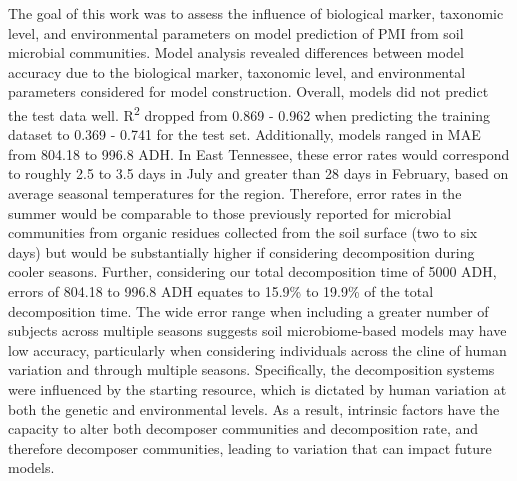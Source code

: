 \documentclass[
  10pt,
  letterpaper,
]{article}
\begin{document}
The goal of this work was to assess the influence of biological marker,
taxonomic level, and environmental parameters on model prediction of PMI
from soil microbial communities. Model analysis revealed differences
between model accuracy due to the biological marker, taxonomic level,
and environmental parameters considered for model construction. Overall,
models did not predict the test data well. R\textsuperscript{2} dropped
from 0.869 - 0.962 when predicting the training dataset to 0.369 - 0.741
for the test set. Additionally, models ranged in MAE from 804.18 to
996.8 ADH. In East Tennessee, these error rates would correspond to
roughly 2.5 to 3.5 days in July and greater than 28 days in February,
based on average seasonal temperatures for the region. Therefore, error
rates in the summer would be comparable to those previously reported for
microbial communities from organic residues collected from the soil
surface (two to six days) \citep{belk_microbiome_2018} but would be
substantially higher if considering decomposition during cooler seasons.
Further, considering our total decomposition time of 5000 ADH, errors of
804.18 to 996.8 ADH equates to 15.9\% to 19.9\% of the total
decomposition time. The wide error range when including a greater number
of subjects across multiple seasons suggests soil microbiome-based
models may have low accuracy, particularly when considering individuals
across the cline of human variation and through multiple seasons.
Specifically, the decomposition systems were influenced by the starting
resource, which is dictated by human variation at both the genetic and
environmental levels. As a result, intrinsic factors have the capacity
to alter both decomposer communities and decomposition rate, and
therefore decomposer communities, leading to variation that can impact
future models.
\end{document}
